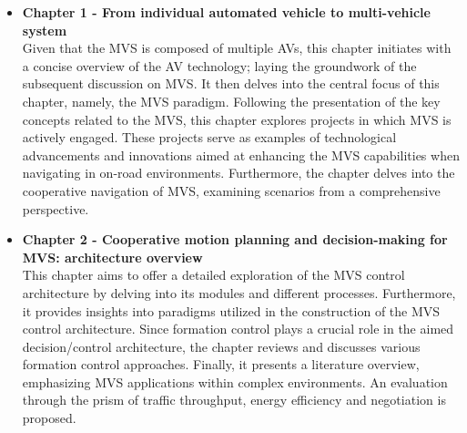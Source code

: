 \begin{itemize}
    \item \textbf{Chapter 1 - From individual automated vehicle to multi-vehicle system}\\
     Given that the MVS is composed of multiple AVs, this chapter initiates with a concise overview of the AV technology; laying the groundwork of the subsequent discussion on MVS. It then delves into the central focus of this chapter, namely, the MVS paradigm. Following the presentation of the key concepts related to the MVS, this chapter explores projects in which MVS is actively engaged. These projects serve as examples of technological advancements and innovations aimed at enhancing the MVS capabilities when navigating in on-road environments. Furthermore, the chapter delves into the cooperative navigation of MVS, examining scenarios from a comprehensive perspective. 

     \item \textbf{Chapter 2 - Cooperative motion planning and decision-making for MVS: architecture overview}\\
       This chapter aims to offer a detailed exploration of the MVS control architecture by delving into its modules and different processes. Furthermore, it provides insights into paradigms utilized in the construction of the MVS control architecture. Since formation control plays a crucial role in the aimed decision/control architecture, the chapter reviews and discusses various formation control approaches. Finally, it presents a literature overview, emphasizing MVS applications within complex environments. An evaluation through the prism of traffic throughput, energy efficiency and negotiation is proposed. 
    

    
\end{itemize}

